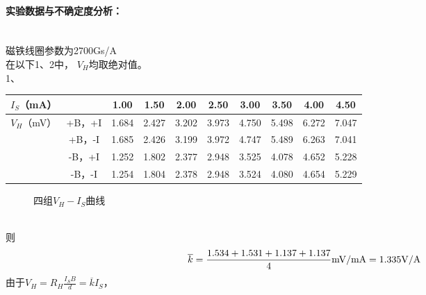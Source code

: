 \documentclass[UTF8]{ctexart}
\begin{document}
\paragraph*{实验数据与不确定度分析：}~\\
\indent 磁铁线圈参数为2700Gs/A~\\
\indent 在以下1、2中，
$V_{H}$均取绝对值。~\\
1、\begin{table}[H]
    \centering
    \begin{tabular}{c|c|cccccccc}
        \hline
    $I_{S}$（mA）  & & 1.00  & 1.50  & 2.00   & 2.50  & 3.00   & 3.50   & 4.00 & 4.50  \\
    \hline
   \multirow{4}{*}{$V_{H}$（mV）}&+B，+I &1.684 &2.427 &3.202 &3.973  &4.750  &5.498  &6.272  &7.047\\
   \cline{2-10}
   &+B，-I &1.685 &2.426 &3.199 &3.972  &4.747  &5.489  &6.263  &7.041\\
   \cline{2-10}
   &-B，+I &1.252 &1.802 &2.377 &2.948  &3.525  &4.078  &4.652  &5.228\\
   \cline{2-10}
   &-B，-I &1.254 &1.804 &2.378 &2.948  &3.524  &4.080  &4.654  &5.229\\
        \hline                    
    \end{tabular}
    \end{table}
    \begin{figure}[H]
        \centering
\centering
\caption{四组$V_{H}-I_{S}$曲线}
\end{figure}
 ~\\
 则$$\overline{k}=\frac{1.534+1.531+1.137+1.137}{4}\rm{mV/mA}=1.335\rm{V/A}$$
 由于$V_{H}=R_{H}\frac{I_{S}B}{d}=\overline{k}I_{S}$，
\end{document}
